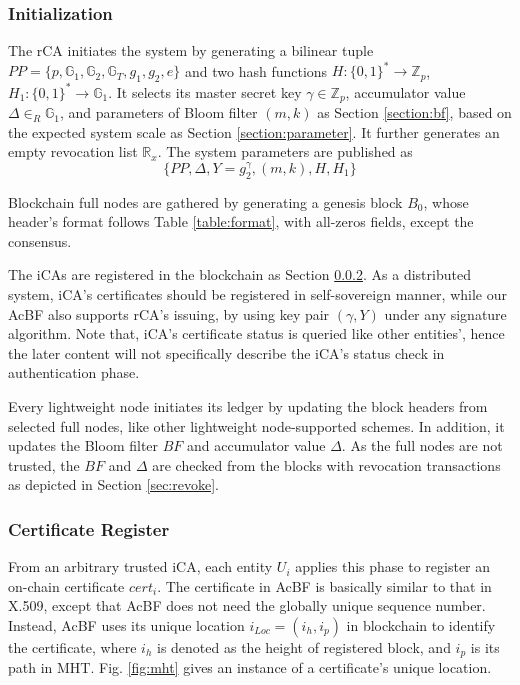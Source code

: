 \documentclass[conference]{IEEEtran}
\begin{document}
\subsubsection{Initialization}
The rCA initiates the system by generating a bilinear tuple $PP=\{p, \mathbb{G}_1, \mathbb{G}_2, \mathbb{G}_T, g_1, g_2, e\}$ and two hash functions $H:\{0, 1\}^* \rightarrow \mathbb{Z}_p$, $H_1:\{0, 1\}^* \rightarrow \mathbb{G}_1$. It selects its master secret key $\gamma\in \mathbb{Z}_p$, accumulator value $\Delta\in_R \mathbb{G}_1$, 
and parameters of Bloom filter $(m, k)$ as Section \ref{section:bf}, based on the expected system scale as Section \ref{section:parameter}. It further generates an empty revocation list $\mathbb{R}_x$. The system parameters are published as 
$$ \bigl\{ PP, \Delta, Y = g_2^\gamma, (m, k), H, H_1 \bigr\}$$

Blockchain full nodes are gathered by generating a genesis block $B_0$, whose header's format follows Table \ref{table:format}, with all-zeros fields, except the consensus. 

The iCAs are registered in the blockchain as Section \ref{section:register}. As a distributed system, iCA's certificates should be registered in self-sovereign manner, while our AcBF also supports rCA's issuing, by using key pair $(\gamma, Y)$ under any signature algorithm. Note that, iCA's certificate status is queried like other entities', hence the later content will not specifically describe the iCA's status check in authentication phase. 


Every lightweight node initiates its ledger by updating the block headers from selected full nodes, like other lightweight node-supported schemes. In addition, it updates the Bloom filter $BF$ and accumulator value $\Delta$. As the full nodes are not trusted, the $BF$ and $\Delta$ are checked from the blocks with revocation transactions as depicted in Section \ref{sec:revoke}.

\subsubsection{Certificate Register}\label{section:register}
From an arbitrary trusted iCA, each entity $U_i$ applies this phase to register an on-chain certificate $cert_i$. The certificate in AcBF is basically similar to that in X.509, except that AcBF does not need the globally unique sequence number. Instead, AcBF uses its unique location $i_{Loc} = (i_h, i_p)$ in blockchain to identify the certificate, where $i_h$ is denoted as the height of registered block, and $i_p$ is its path in MHT. Fig. \ref{fig:mht} gives an instance of a certificate's unique location. 
\end{document}
